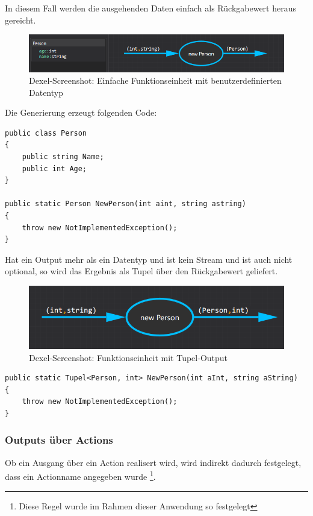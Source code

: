 	In diesem Fall werden die ausgehenden Daten einfach als Rückgabewert heraus gereicht.
	
	
	\begin{figure}[H]
		\centering
			\includegraphics[width=\linewidth]{./img/roslyn_simpleOutput.png} 
		\caption{Dexel-Screenshot: Einfache Funktionseinheit mit benutzerdefinierten Datentyp}
	\end{figure}

	
	Die Generierung erzeugt folgenden Code:
	\begin{lstlisting}[caption=Mit Dexel generierter Code ]
public class Person
{
	public string Name;
	public int Age;
}

public static Person NewPerson(int aint, string astring)
{
	throw new NotImplementedException();
}
	\end{lstlisting}
	
	Hat ein Output mehr als ein Datentyp und ist kein Stream und ist auch nicht optional, so
	wird das Ergebnis als Tupel über den Rückgabewert geliefert.
	
		\begin{figure}[H]
			\centering
			\includegraphics[width=.8\linewidth]{./img/roslyn_twoDatatypesOneOutput.png} 
			\caption{Dexel-Screenshot: Funktionseinheit mit Tupel-Output}
		\end{figure}

	
	
	\begin{lstlisting}[caption=Mit Dexel generierter Code ]
public static Tupel<Person, int> NewPerson(int aInt, string aString)
{
	throw new NotImplementedException();
}
	\end{lstlisting}

	
\subsubsection{Outputs über Actions}

	Ob ein Ausgang über ein Action realisert wird, wird indirekt dadurch
	festgelegt, dass ein Actionname angegeben wurde \footnote{Diese Regel wurde im
		Rahmen dieser Anwendung so festgelegt}. 
	
